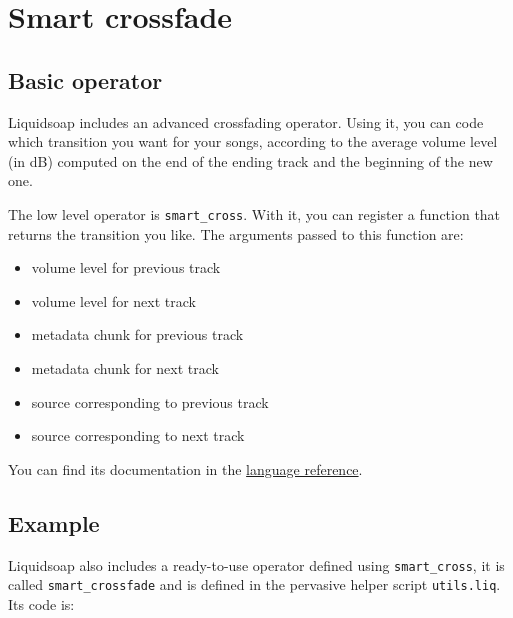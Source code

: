 \section{Smart crossfade}
\subsection{Basic operator}
Liquidsoap includes an advanced crossfading operator. Using it, you can code which transition you want for your songs, according to the average volume level (in dB) computed on the end of the ending track and the beginning of the new one.

The low level operator is \verb+smart_cross+. With it, you can register a function that returns the transition you like. The arguments passed to this function are:

\begin{itemize}
\item volume level for previous track
\item volume level for next track
\item metadata chunk for previous track
\item metadata chunk for next track
\item source corresponding to previous track
\item source corresponding to next track

\end{itemize}
You can find its documentation in the \href{reference.html}{language reference}.

\subsection{Example}
Liquidsoap also includes a ready-to-use operator defined using \verb+smart_cross+, it is called \verb+smart_crossfade+ and is defined in the pervasive helper script \verb+utils.liq+. Its code is:

